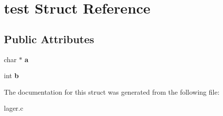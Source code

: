 \hypertarget{structtest}{}\section{test Struct Reference}
\label{structtest}
\subsection*{Public Attributes}
\begin{DoxyCompactItemize}
\item 
char $\ast$ {\bfseries a}\hypertarget{structtest_aad4bcf4a89644c9ad3adc507df7eef15}{}\label{structtest_aad4bcf4a89644c9ad3adc507df7eef15}

\item 
int {\bfseries b}\hypertarget{structtest_ac52450ad7e71deba8e07a10cfea034ed}{}\label{structtest_ac52450ad7e71deba8e07a10cfea034ed}

\end{DoxyCompactItemize}


The documentation for this struct was generated from the following file\+:\begin{DoxyCompactItemize}
\item 
lager.\+c\end{DoxyCompactItemize}

